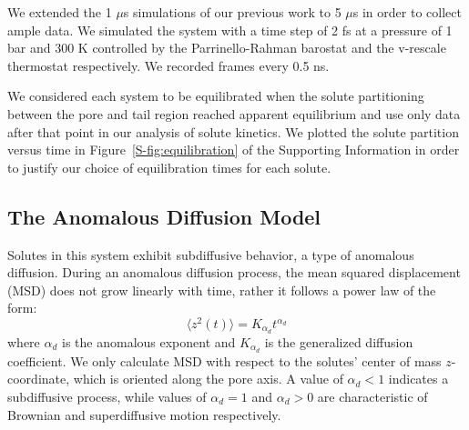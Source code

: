 \documentclass{article}
\begin{document}
  We extended the 1 $\mu$s simulations of our previous work to 5 $\mu$s in order
  to collect ample data. We simulated the system with a time step of 2 fs at a pressure
  of 1 bar and 300 K controlled by the Parrinello-Rahman barostat and the v-rescale 
  thermostat respectively. We recorded frames every 0.5 ns.
  
  We considered each system to be equilibrated when the solute partitioning between the 
  pore and tail region reached apparent equilibrium and use only data after that point
  in our analysis of solute kinetics. We plotted the solute partition versus time in
  Figure~\ref{S-fig:equilibration} of the Supporting Information in order to justify 
  our choice of equilibration times for each solute.

  \subsection{The Anomalous Diffusion Model}\label{method:model_sFBM}

  Solutes in this system exhibit subdiffusive behavior, a type of anomalous diffusion.
  During an anomalous diffusion process, the mean squared displacement (MSD)
  does not grow linearly with time, rather it follows a power law of the form:
  \begin{equation} 
  \langle z^2(t) \rangle = K_{\alpha_d}t^{\alpha_d}
  \label{eqn:msd_form}
  \end{equation} 
  where $\alpha_d$ is the anomalous exponent and $K_{\alpha_d}$ is the generalized 
  diffusion coefficient. We only calculate MSD with respect to the solutes' center of
  mass $z$-coordinate, which is oriented along the pore axis. A value of $\alpha_d < 1$
  indicates a subdiffusive process, while values of $\alpha_d = 1$ and $\alpha_d > 0$ 
  are characteristic of Brownian and superdiffusive motion respectively.
  
\end{document}
